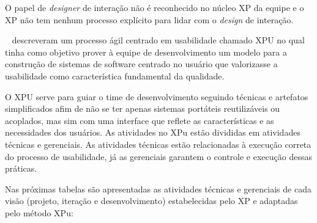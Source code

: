 O papel de \emph{designer} de interação não é reconhecido no núcleo XP da equipe e o XP não tem nenhum processo explícito para lidar com o \emph{design} de interação. 
%

~ descreveram um processo ágil centrado em usabilidade chamado XPU no qual tinha como objetivo prover à equipe de desenvolvimento um modelo para a construção de sistemas de software centrado no usuário que valorizasse a usabilidade como característica fundamental da qualidade. 

O XPU serve para guiar o time de desenvolvimento seguindo técnicas e artefatos simplificados afim de não se ter apenas sistemas portáteis reutilizáveis ou acoplados, mas sim com uma interface que reflete as características e as necessidades dos usuários. 
%
As atividades no XPu estão divididas em atividades técnicas e gerenciais. As atividades técnicas estão relacionadas à execução correta do processo de usabilidade, já as gerenciais garantem o controle e execução dessas práticas.

Nas próximas tabelas são apresentadas as atividades técnicas e gerenciais de cada visão (projeto, iteração e desenvolvimento) estabelecidas pelo XP e adaptadas pelo método XPu:

